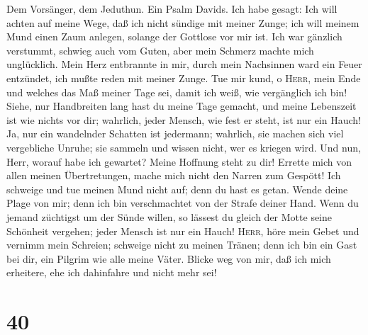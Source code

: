  Dem Vorsänger, dem Jeduthun. Ein Psalm Davids. Ich habe
gesagt: Ich will achten auf meine Wege, daß ich nicht sündige mit meiner
Zunge; ich will meinem Mund einen Zaum anlegen, solange der Gottlose vor
mir ist.  Ich war gänzlich verstummt, schwieg auch vom
Guten, aber mein Schmerz machte mich unglücklich.  Mein
Herz entbrannte in mir, durch mein Nachsinnen ward ein Feuer entzündet,
ich mußte reden mit meiner Zunge.  Tue mir kund, o
\textsc{Herr}, mein Ende und welches das Maß meiner Tage sei, damit ich
weiß, wie vergänglich ich bin!  Siehe, nur Handbreiten
lang hast du meine Tage gemacht, und meine Lebenszeit ist wie nichts vor
dir; wahrlich, jeder Mensch, wie fest er steht, ist nur ein Hauch!
 Ja, nur ein wandelnder Schatten ist jedermann; wahrlich,
sie machen sich viel vergebliche Unruhe; sie sammeln und wissen nicht,
wer es kriegen wird.  Und nun, Herr, worauf habe ich
gewartet? Meine Hoffnung steht zu dir!  Errette mich von
allen meinen Übertretungen, mache mich nicht den Narren zum Gespött!
 Ich schweige und tue meinen Mund nicht auf; denn du hast
es getan.  Wende deine Plage von mir; denn ich bin
verschmachtet von der Strafe deiner Hand.  Wenn du jemand
züchtigst um der Sünde willen, so lässest du gleich der Motte seine
Schönheit vergehen; jeder Mensch ist nur ein Hauch! 
\textsc{Herr}, höre mein Gebet und vernimm mein Schreien; schweige nicht
zu meinen Tränen; denn ich bin ein Gast bei dir, ein Pilgrim wie alle
meine Väter.  Blicke weg von mir, daß ich mich erheitere,
ehe ich dahinfahre und nicht mehr sei!

\hypertarget{section-39}{%
\section{40}\label{section-39}}

